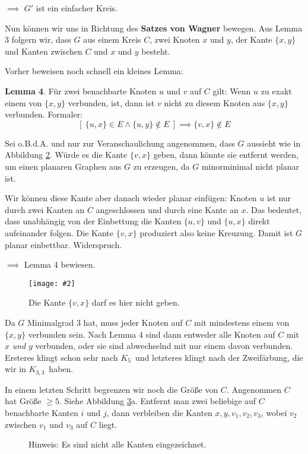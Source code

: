 \documentclass[10pt,a4paper]{article}
\makeatletter
\def\maxwidth#1{\ifdim\Gin@nat@width>#1 #1\else\Gin@nat@width\fi}
\newcommand{\imageFigure}[4]{%
    \begin{figure}[h]%
        \centering%
        {%
            \setlength{\fboxsep}{1pt}%
            \setlength{\fboxrule}{1pt}%
            \texttt{[image: \#2]}%
        }%
        \caption{#1}%
        \label{fig:#4}%
    \end{figure}%
}
\newcommand{\imageFigureMultS}[7]{%
    \begin{figure}[h]%
        \centering
        \subfloat[#1]{{\texttt{[image: \#2]} }}%
        \qquad
        \subfloat[#3]{{\texttt{[image: \#4]} }}%
        \caption{#5}%
        \label{fig:#6}%
    \end{figure}
}
\newcommand{\Kf}{$K_5$}
\newcommand{\Kdd}{$K_{3,3}$}
\makeatother
\begin{document}
\imageFigureMultS{$C$ kann nicht Länge $> 3$ haben.}{prisma3.png}
{\textit{Prisma}-Graph}{prisma3.png}{}{prisma3}{.35}

$\implies$ $G'$ ist ein einfacher Kreis.

Nun können wir uns in Richtung des \textbf{Satzes von Wagner} bewegen.
Aus Lemma 3 folgern wir, dass $G$ aus einem Kreis $C$, zwei Knoten $x$ und $y$,
der Kante $\{x,y\}$ und Kanten zwischen $C$ und $x$ und $y$ besteht.

Vorher beweisen noch schnell ein kleines Lemma:

\textbf{Lemma 4}. Für zwei benachbarte Knoten $u$ und $v$ auf $C$ gilt:
Wenn $u$ zu exakt einem von $\{x, y\}$ verbunden, ist, dann ist $v$ nicht zu
diesem Knoten aus $\{x, y\}$ verbunden.
Formaler:
$$[~\{u,x\} \in E \land \{u,y\} \notin E~] \implies \{v,x\} \notin E$$

Sei o.B.d.A. und nur zur Veranschaulichung angenommen, dass $G$ aussieht wie in
Abbildung \ref{fig:lem4}.
Würde es die Kante $\{v, x\}$ geben, dann könnte sie entfernt werden, um einen
planaren Graphen aus $G$ zu erzeugen, da $G$ minorminimal nicht planar ist.

Wir können diese Kante aber danach wieder planar einfügen:
Knoten $u$ ist nur durch zwei Kanten an $C$ angeschlossen und durch eine Kante
an $x$.
Das bedeutet, dass unabhängig von der Einbettung die Kanten $\{u, v\}$ und
$\{u, x\}$ direkt aufeinander folgen.
Die Kante $\{v, x\}$ produziert also keine Kreuzung.
Damit ist $G$ planar einbettbar. Widerspruch.

$\implies$ Lemma 4 bewiesen.

\imageFigure{Die Kante $\{v, x\}$ darf es hier nicht
geben.}{lem4.png}{.4}{lem4}

Da $G$ Minimalgrad 3 hat, muss jeder Knoten auf $C$ mit mindestens einem von
$\{x, y\}$ verbunden sein.
Nach Lemma 4 sind dann entweder alle Knoten auf $C$ mit $x$ \textit{und} $y$
verbunden, oder sie sind abwechselnd mit nur einem davon verbunden.
Ersteres klingt schon sehr nach \Kf~und letzteres klingt nach der Zweifärbung,
die wir in \Kdd~haben.

In einem letzten Schritt begrenzen wir noch die Größe von $C$.
Angenommen $C$ hat Größe $\geq 5$.
Siehe Abbildung \ref{fig:csize}a.
Entfernt man zwei beliebige auf $C$ benachbarte Kanten $i$ und $j$, dann
verbleiben die Kanten $x, y, v_1, v_2, v_3$, wobei $v_2$ zwischen $v_1$ und
$v_3$ auf $C$ liegt.

\imageFigureMultS{$|C| \geq 5$}{csize1.png}
{$|C| = 4$ und alle Knoten sind mit $x$ und $y$ verbunden.}{csize2.png}
{Hinweis: Es sind nicht alle Kanten eingezeichnet.}{csize}{.2}
\end{document}
